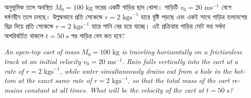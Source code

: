 \documentclass[12pt, a4paper]{article}
\begin{document}
\newpage

\begin{tcolorbox}[questionbox={প্রশ্ন (Question) 7}]
    \noindent
    অনুভূমিক তলে অবস্থিত $M_0 = 100\text{ kg}$ ভরের একটি গাড়ির ছাদ খোলা। গাড়িটি $v_0 = 20\text{ ms}^{-1}$ বেগে ঘর্ষণহীন তলে চলছে। উল্লম্বভাবে প্রতি সেকেন্ডে $r = 2\text{ kgs}^{-1}$ হারে বৃষ্টি পড়ছে এবং একই সাথে গাড়ির তলদেশের ছিদ্র দিয়ে প্রতি সেকেন্ডে $r = 2\text{ kgs}^{-1}$ হারে পানি বের হয়ে যাচ্ছে। এই প্রক্রিয়ায় গাড়ির মোট ভর সর্বদা অপরিবর্তিত থাকলে $t = 50\text{ s}$ পর গাড়ির বেগ কত হবে?
    
    \vspace{0.8em}
    \begin{english}
    \noindent\textit{\color{darkgray}
    An open-top cart of mass $M_0 = 100\text{ kg}$ is traveling horizontally on a frictionless track at an initial velocity $v_0 = 20\text{ ms}^{-1}$. Rain falls vertically into the cart at a rate of $r = 2\text{ kgs}^{-1}$, while water simultaneously drains out from a hole in the bottom at the exact same rate of $r = 2\text{ kgs}^{-1}$, so that the total mass of the cart remains constant at all times. What will be the velocity of the cart at $t = 50\text{ s}$?
    }
    \end{english}
\end{tcolorbox}
\end{document}
